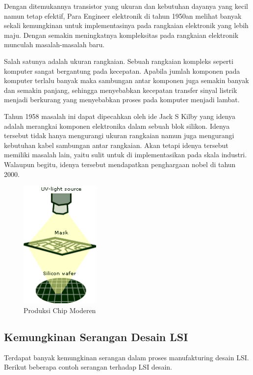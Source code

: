 Dengan ditemukannya transistor yang ukuran dan kebutuhan dayanya yang kecil namun tetap efektif, Para Engineer elektronik di tahun 1950an melihat banyak sekali kemungkinan untuk implementasinya pada rangkaian elektronik yang lebih maju. Dengan semakin meningkatnya kompleksitas pada rangkaian elektronik munculah masalah-masalah baru.

Salah satunya adalah ukuran rangkaian. Sebuah rangkaian kompleks seperti komputer sangat bergantung pada kecepatan. Apabila jumlah komponen pada komputer terlalu banyak maka sambungan antar komponen juga semakin banyak dan semakin panjang, sehingga menyebabkan kecepatan transfer sinyal listrik menjadi berkurang yang menyebabkan proses pada komputer menjadi lambat.

Tahun 1958 masalah ini dapat dipecahkan oleh ide Jack S Kilby yang idenya adalah merangkai komponen elektronika dalam sebuah blok silikon. Idenya tersebut tidak hanya mengurangi ukuran rangkaian namun juga mengurangi kebutuhan kabel sambungan antar rangkaian. Akan tetapi idenya tersebut memiliki masalah lain, yaitu sulit untuk di implementasikan pada skala industri. Walaupun begitu, idenya tersebut mendapatkan penghargaan nobel di tahun 2000.

\begin{figure}
	\centering
	\includegraphics[width=0.35\textwidth]
	{pics/steping.png}
	\caption{Produksi Chip Moderen}
	\label{fig:produksiChipModeren}
\end{figure}



\subsection{Kemungkinan Serangan Desain LSI}
Terdapat banyak kemungkinan serangan dalam proses manufakturing desain LSI. Berikut beberapa contoh serangan terhadap LSI desain.

